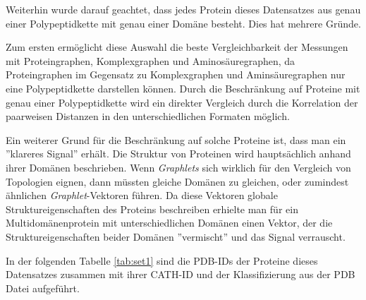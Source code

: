 \documentclass{report}
\begin{document}
Weiterhin wurde darauf geachtet, dass jedes Protein dieses Datensatzes aus genau einer Polypeptidkette mit genau einer Dom\"ane besteht. Dies hat mehrere Gr\"unde.

Zum ersten erm\"oglicht diese Auswahl die beste Vergleichbarkeit der Messungen mit Proteingraphen, Komplexgraphen und Aminos\"auregraphen, da Proteingraphen im Gegensatz zu Komplexgraphen und Amins\"auregraphen nur eine Polypeptidkette darstellen k\"onnen. Durch die Beschr\"ankung auf Proteine mit genau einer Polypeptidkette wird ein direkter Vergleich durch die Korrelation der paarweisen Distanzen in den unterschiedlichen Formaten m\"oglich.

Ein weiterer Grund f\"ur die Beschr\"ankung auf solche Proteine ist, dass man ein ''klareres Signal'' erh\"alt. Die Struktur von Proteinen wird haupts\"achlich anhand ihrer Dom\"anen beschrieben. Wenn \textit{Graphlets} sich wirklich f\"ur den Vergleich von Topologien eignen, dann m\"ussten gleiche Dom\"anen zu gleichen, oder zumindest \"ahnlichen \textit{Graphlet}-Vektoren f\"uhren.
Da diese Vektoren globale Struktureigenschaften des Proteins beschreiben erhielte man f\"ur ein Multidom\"anenprotein mit unterschiedlichen Dom\"anen einen Vektor, der die Struktureigenschaften beider Dom\"anen ''vermischt'' und das Signal verrauscht.


In der folgenden Tabelle \ref{tab:set1} sind die PDB-IDs der Proteine dieses Datensatzes zusammen mit ihrer CATH-ID und der Klassifizierung aus der PDB Datei aufgef\"uhrt.
\end{document}
